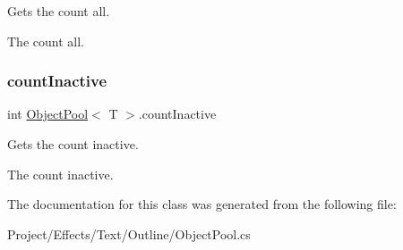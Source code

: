 Gets the count all. 

The count all.\mbox{\label{class_object_pool_afd6b674fd2d20832cf244c2804e1df9a}} 
\subsubsection{\texorpdfstring{count\+Inactive}{countInactive}}
{\footnotesize\ttfamily int \hyperlink{class_object_pool}{Object\+Pool}$<$ T $>$.count\+Inactive\hspace{0.3cm}{\ttfamily [get]}}



Gets the count inactive. 

The count inactive.

The documentation for this class was generated from the following file\+:\begin{DoxyCompactItemize}
\item 
Project/\+Effects/\+Text/\+Outline/Object\+Pool.\+cs\end{DoxyCompactItemize}
